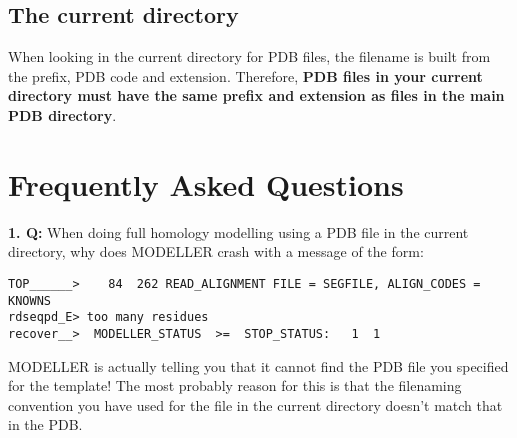\documentclass[12pt]{article}
\begin{document}
\subsection{The current directory}
\noindent When looking in the current directory for PDB files, the
filename is built from the prefix, PDB code and extension. Therefore,
{\bfseries PDB files in your current directory must have the same prefix and
extension as files in the main PDB directory}.




\section{Frequently Asked Questions}

{\bfseries 1. Q:} When doing full homology modelling using a PDB file
in the current directory, why does MODELLER crash with a message of
the form:
\begin{verbatim}
TOP______>    84  262 READ_ALIGNMENT FILE = SEGFILE, ALIGN_CODES = KNOWNS
rdseqpd_E> too many residues
recover__>  MODELLER_STATUS  >=  STOP_STATUS:   1  1
\end{verbatim}

 MODELLER is actually telling you that it cannot find
the PDB file you specified for the template! The most probably reason
for this is that the filenaming convention you have used for the file
in the current directory doesn't match that in the PDB.
\vspace{1em}
\end{document}
